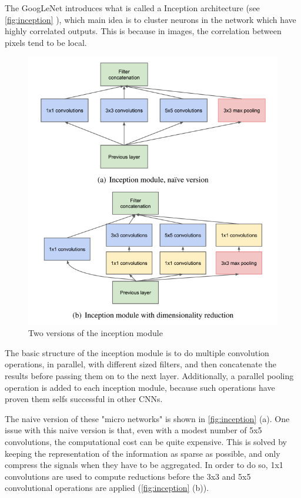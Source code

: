 The GoogLeNet introduces what is called a Inception architecture (see \autoref{fig:inception} ), which main idea is to cluster neurons in the network which have highly correlated outputs. This is because in images, the correlation between pixels tend to be local. 

\begin{figure}[!h]
	\centering
	\includegraphics[scale=0.5]{fig/inception_layer.png}
	\caption{Two versions of the inception module \citep{Szegedy2014}}
	\label{fig:inception}
\end{figure}

The basic structure of the inception module is to do multiple convolution operations, in parallel, with different sized filters, and then concatenate the results before passing them on to the next layer. Additionally, a parallel pooling operation is added to each inception module, because such operations have proven them selfs successful in other CNNs.

The naive version of these "micro networks" is shown in \autoref{fig:inception} (a). One issue with this naive version is that, even with a modest number of 5x5 convolutions, the computational cost can be quite expensive. This is solved by keeping the representation of the information as sparse as possible, and only compress the signals when they have to be aggregated. In order to do so, 1x1 convolutions are used to compute reductions before the 3x3 and 5x5 convolutional operations are applied (\autoref{fig:inception} (b)).

